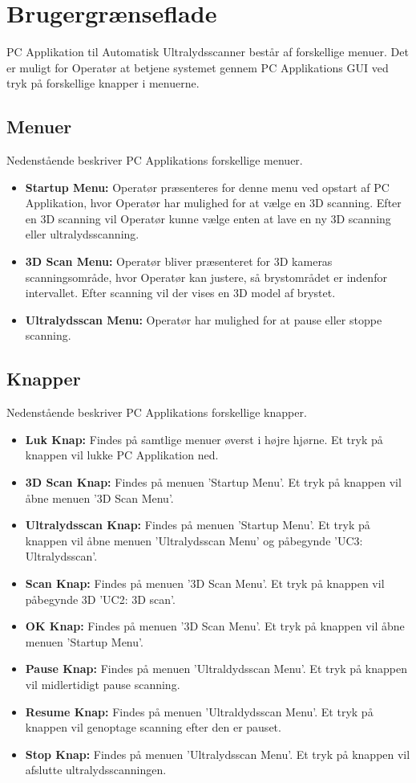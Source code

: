 \chapter{Brugergrænseflade}\label{Brugerganseflade}

PC Applikation til Automatisk Ultralydsscanner består af forskellige menuer.  Det er muligt for Operatør at betjene systemet gennem PC Applikations GUI ved tryk på forskellige knapper i menuerne. 

\section{Menuer}
Nedenstående beskriver PC Applikations forskellige menuer. 
\begin{itemize}
\item \textbf{Startup Menu:} Operatør præsenteres for denne menu ved opstart af PC Applikation, hvor Operatør har mulighed for at vælge en 3D scanning. Efter en 3D scanning vil Operatør kunne vælge enten at lave en ny 3D scanning eller ultralydsscanning. 
\item \textbf{3D Scan Menu: } Operatør bliver præsenteret for 3D kameras scanningsområde, hvor Operatør kan justere, så brystområdet er indenfor intervallet. Efter scanning vil der vises en 3D model af brystet. 
\item \textbf{Ultralydsscan Menu:} Operatør har mulighed for at pause eller stoppe scanning. 
\end{itemize}

\section{Knapper}
Nedenstående beskriver PC Applikations forskellige knapper. 
\begin{itemize}
\item \textbf{Luk Knap:} Findes på samtlige menuer øverst i højre hjørne. Et tryk på knappen vil lukke PC Applikation ned. 
\item \textbf{3D Scan Knap:} Findes på menuen 'Startup Menu'. Et tryk på knappen vil åbne menuen '3D Scan Menu'. 
\item \textbf{Ultralydsscan Knap:} Findes på menuen 'Startup Menu'. Et tryk på knappen vil åbne menuen 'Ultralydsscan Menu' og påbegynde 'UC3: Ultralydsscan'. 
\item \textbf{Scan Knap:} Findes på menuen '3D Scan Menu'. Et tryk på knappen vil påbegynde 3D 'UC2: 3D scan'. 
\item \textbf{OK Knap:} Findes på menuen '3D Scan Menu'. Et tryk på knappen vil åbne menuen 'Startup Menu'. 
\item \textbf{Pause Knap:} Findes på menuen 'Ultraldydsscan Menu'. Et tryk på knappen vil midlertidigt pause scanning.  
\item \textbf{Resume Knap:} Findes på menuen 'Ultraldydsscan Menu'. Et tryk på knappen vil genoptage scanning efter den er pauset. 
\item \textbf{Stop Knap:} Findes på menuen 'Ultralydsscan Menu'. Et tryk på knappen vil afslutte ultralydsscanningen. 
\end{itemize}

